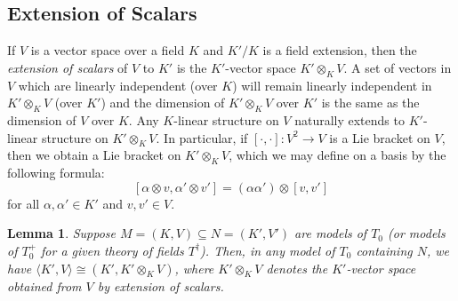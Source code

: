 \documentclass[psamsfonts]{amsart}
\newtheorem{lem}[thm]{Lemma}
\theoremstyle{definition}
\theoremstyle{definition}
\theoremstyle{remark}
\numberwithin{equation}{section}
\begin{document}
\subsection{Extension of Scalars} 

If $V$ is a vector space over a field $K$ and $K'/K$ is a field extension, then the \emph{extension of scalars} of $V$ to $K'$ is the $K'$-vector space $K' \otimes_{K} V$.  A set of vectors in $V$ which are linearly independent (over $K$) will remain linearly independent in $K' \otimes_{K} V$ (over $K'$) and the dimension of $K' \otimes_{K} V$ over $K'$ is the same as the dimension of $V$ over $K$.  Any $K$-linear structure on $V$ naturally extends to $K'$-linear structure on $K' \otimes_{K} V$.  In particular, if $[\cdot,\cdot] :V^{2} \to V$ is a Lie bracket on $V$, then we obtain a Lie bracket on $K' \otimes_{K} V$, which we may define on a basis by the following formula:
$$
[\alpha \otimes v, \alpha' \otimes v'] = (\alpha \alpha') \otimes [v,v']
$$
for all $\alpha, \alpha' \in K'$ and $v,v' \in V$.  

\begin{lem} \label{extension of scalars}
    Suppose $M =(K,V) \subseteq N=(K',V')$ are models of $T_{0}$ (or models of $T_{0}^{+}$ for a given theory of fields $T^{\dagger}$).  Then, in any model of $T_0$ containing $N$, we have $\langle K',V\rangle \cong (K', K' \otimes_{K} V)$, where $K' \otimes_{K} V$ denotes the $K'$-vector space obtained from $V$ by extension of scalars. 
\end{lem}
\end{document}
